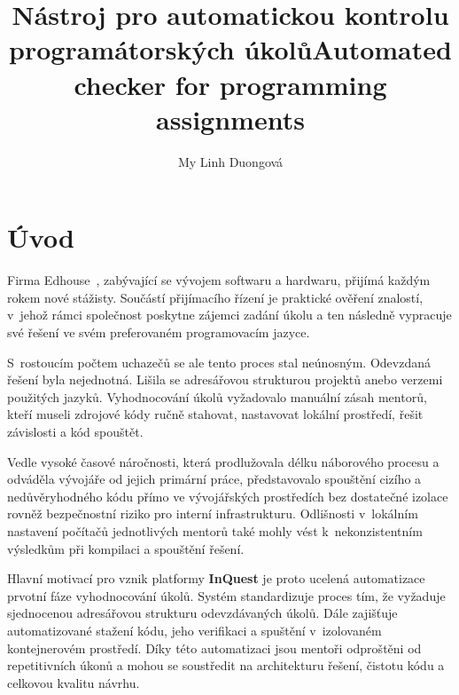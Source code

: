 \documentclass[
  biblatex,
  figures,
  tables,
  glossaries,
  index
]{kidiplom}
\title{Nástroj pro automatickou kontrolu programátorských úkolů}
\title[english]{Automated checker for programming assignments}
\author{My Linh Duongová}
\begin{document}
\maketitle



\newcommand{\BibLaTeX}{\textsc{Bib}\LaTeX}


\section{Úvod}
Firma Edhouse~\cite{edhouse}, zabývající se vývojem softwaru a hardwaru, přijímá každým rokem nové stážisty. Součástí přijímacího řízení je praktické ověření znalostí, v~jehož rámci společnost poskytne zájemci zadání úkolu a ten následně vypracuje své řešení ve svém preferovaném programovacím jazyce.

S~rostoucím počtem uchazečů se ale tento proces stal neúnosným. Odevzdaná řešení byla nejednotná. Lišila se adresářovou strukturou projektů anebo verzemi použitých jazyků. Vyhodnocování úkolů vyžadovalo manuální zásah mentorů, kteří museli zdrojové kódy ručně stahovat, nastavovat lokální prostředí, řešit závislosti a kód spouštět.

Vedle vysoké časové náročnosti, která prodlužovala délku náborového procesu a odváděla vývojáře od jejich primární práce, představovalo spouštění cizího a nedůvěryhodného kódu přímo ve vývojářských prostředích bez dostatečné izolace rovněž bezpečnostní riziko pro interní infrastrukturu. Odlišnosti v~lokálním nastavení počítačů jednotlivých mentorů také mohly vést k~nekonzistentním výsledkům při kompilaci a spouštění řešení.

Hlavní motivací pro vznik platformy \textbf{InQuest} je proto ucelená automatizace prvotní fáze vyhodnocování úkolů. Systém standardizuje proces tím, že vyžaduje sjednocenou adresářovou strukturu odevzdávaných úkolů. Dále zajišťuje automatizované stažení kódu, jeho verifikaci a spuštění v~izolovaném kontejnerovém prostředí. Díky této automatizaci jsou mentoři odproštěni od repetitivních úkonů a mohou se soustředit na architekturu řešení, čistotu kódu a celkovou kvalitu návrhu.
\end{document}
